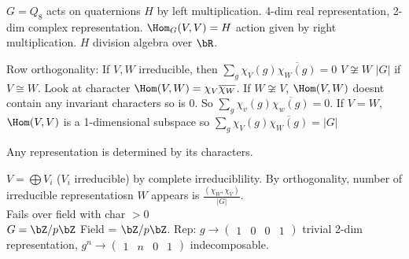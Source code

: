 \begin{example}
    $G = Q_8$ acts on quaternions $H$ by left multiplication. 4-dim real representation, 2-dim complex representation. $\Hom_G(V,V)=H$ action given by right multiplication. $H$ division algebra over $\bR$. 
\end{example}

\noindent
Row orthogonality: If $V,W$ irreducible, then $\sum_g \chi_V(g) \overline{\chi_W(g)}=0$ $V \not\cong W$ $|G|$ if $V \cong W$. Look at character $\Hom(V,W) = \chi_V \overline{\chi_W}$. If $W \not\cong V$, $\Hom(V,W)$ doesnt contain any invariant characters so is 0. So $\sum_g \chi_v(g)\overline{\chi_w(g)}=0$. If $V = W$, $\Hom(V,V)$ is a 1-dimensional subspace so $\sum_g \chi_V(g)\overline{\chi_W(g)}=|G|$ \\

\begin{corollary}
    Any representation is determined by its characters. 
\end{corollary}

$V = \bigoplus V_i$ ($V_i$ irreducible) by complete irreduciblility. By orthogonality, number of irreducible representatiosn $W$ appears is $\frac{(\chi_W, \chi_V)}{|G|}$. \\
Fails over field with char $>0$ \\ 
$G = \bZ/p\bZ$ Field = $\bZ/p\bZ$. Rep: $g \to \begin{pmatrix} 1 & 0 & 0 & 1 \end{pmatrix}$ trivial 2-dim representation, $g^n \to \begin{pmatrix} 1 & n & 0 & 1 \end{pmatrix}$ indecomposable. 